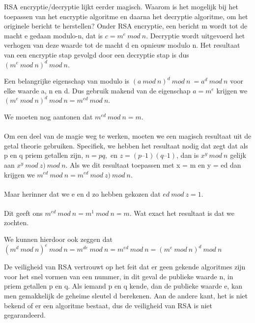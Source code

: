 \clearpage


RSA encryptie/decryptie lijkt eerder magisch. Waarom is het mogelijk bij het toepassen van het encryptie algoritme en daarna het decryptie algoritme, om het originele bericht te herstellen? 
Onder RSA encryptie, een bericht m wordt tot de macht e gedaan modulo-n, dat is $c = m^e\ mod\ n$.
Decryptie wordt uitgevoerd het verhogen van deze waarde tot de macht d en opnieuw modulo n. Het resultaat van een encryptie stap gevolgd door een decryptie stap is dus $(m^e\ mod\ n)^d\ mod\ n$.

Een belangrijke eigenschap van modulo is $(a\ mod\ n)^d\ mod\ n\ = a^d\ mod\ n$ voor elke waarde a, n en d. Dus gebruik makend van de eigenschap $a = m^e$ krijgen we $(m^e\ mod\ n)^d\ mod\ n = m^{ed}\ mod\ n$.

We moeten nog aantonen dat $m^{ed}\ mod\ n = m$. \\\\Om een deel van de magie weg te werken, moeten we een magisch resultaat uit de getal theorie gebruiken. Specifiek, we hebben het resultaat nodig dat zegt dat als p en q priem getallen zijn, $n = pq, $ en $ z = (p – 1)(q – 1)$, dan is $x^y\ mod\ n$ gelijk aan $x^{y}\ mod\ z) \ mod\ n$. Als we dit resultaat toepassen met x = m en y = ed dan krijgen we $m^{ed}\ mod\ n = m^{ed}\ mod\ z) \ mod\ n$.\\\\
Maar herinner dat we e en d zo hebben gekozen dat $ed\ mod\ z = 1$. \\\\Dit geeft ons $m^{ed}\ mod\ n = m^1\ mod\ n = m$. Wat exact het resultaat is dat we zochten. 

We kunnen hierdoor ook zeggen dat $(m^d\ mod\ n)^e\ mod\ n = m^{de}\ mod\ n = m^{ed}\ mod\ n = (m^e\ mod\ n)^d\ mod\ n$

De veiligheid van RSA vertrouwt op het feit dat er geen gekende algoritmes zijn voor het snel vormen van een nummer, in dit geval de publieke waarde n, in priem getallen p en q. Als iemand p en q kende, dan de publieke waarde e, kan men gemakkelijk de geheime sleutel d berekenen.
Aan de andere kant, het is niet bekend of er een algoritme bestaat, dus de veiligheid van RSA is niet gegarandeerd.
